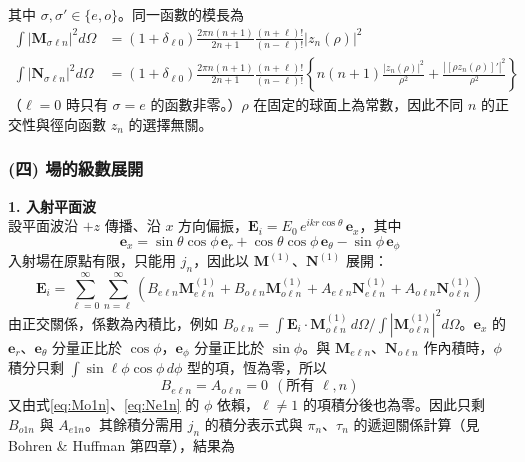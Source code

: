 其中 $\sigma, \sigma' \in \{e, o\}$。同一函數的模長為
\begin{align}
    \int \left| \mathbf{M}_{\sigma\ell n} \right|^2 d\Omega &= \left(1 + \delta_{\ell 0}\right) \frac{2\pi n(n+1)}{2n+1} \frac{(n+\ell)!}{(n-\ell)!} \left| z_n(\rho) \right|^2 \label{eq:normM}\\
    \int \left| \mathbf{N}_{\sigma\ell n} \right|^2 d\Omega &= \left(1 + \delta_{\ell 0}\right) \frac{2\pi n(n+1)}{2n+1} \frac{(n+\ell)!}{(n-\ell)!} \left\{ n(n+1) \frac{\left| z_n(\rho) \right|^2}{\rho^2} + \frac{\left| \left[\rho z_n(\rho)\right]' \right|^2}{\rho^2} \right\}
\end{align}
（$\ell = 0$ 時只有 $\sigma = e$ 的函數非零。）$\rho$ 在固定的球面上為常數，因此不同 $n$ 的正交性與徑向函數 $z_n$ 的選擇無關。

\subsubsection*{(四) 場的級數展開}
\textbf{1. 入射平面波}\\
設平面波沿 $+z$ 傳播、沿 $x$ 方向偏振，$\mathbf{E}_i = E_0\, e^{ikr\cos\theta}\, \mathbf{e}_x$，其中
\begin{equation}
    \mathbf{e}_x = \sin\theta\cos\phi\, \mathbf{e}_r + \cos\theta\cos\phi\, \mathbf{e}_{\theta} - \sin\phi\, \mathbf{e}_{\phi}
\end{equation}
入射場在原點有限，只能用 $j_n$，因此以 $\mathbf{M}^{(1)}$、$\mathbf{N}^{(1)}$ 展開：
\begin{equation}
    \mathbf{E}_i = \sum_{\ell=0}^{\infty} \sum_{n=\ell}^{\infty} \left( B_{e\ell n} \mathbf{M}^{(1)}_{e\ell n} + B_{o\ell n} \mathbf{M}^{(1)}_{o\ell n} + A_{e\ell n} \mathbf{N}^{(1)}_{e\ell n} + A_{o\ell n} \mathbf{N}^{(1)}_{o\ell n} \right)
\end{equation}
由正交關係，係數為內積比，例如 $B_{o\ell n} = \displaystyle \int \mathbf{E}_i \cdot \mathbf{M}^{(1)}_{o\ell n}\, d\Omega \Big/ \int \left| \mathbf{M}^{(1)}_{o\ell n} \right|^2 d\Omega$。$\mathbf{e}_x$ 的 $\mathbf{e}_r$、$\mathbf{e}_{\theta}$ 分量正比於 $\cos\phi$，$\mathbf{e}_{\phi}$ 分量正比於 $\sin\phi$。與 $\mathbf{M}_{e\ell n}$、$\mathbf{N}_{o\ell n}$ 作內積時，$\phi$ 積分只剩 $\int \sin\ell\phi \cos\phi\, d\phi$ 型的項，恆為零，所以
\begin{equation}
    B_{e\ell n} = A_{o\ell n} = 0 \ \ (\text{所有 } \ell, n)
\end{equation}
又由式\eqref{eq:Mo1n}、\eqref{eq:Ne1n} 的 $\phi$ 依賴，$\ell \neq 1$ 的項積分後也為零。因此只剩 $B_{o1n}$ 與 $A_{e1n}$。其餘積分需用 $j_n$ 的積分表示式與 $\pi_n$、$\tau_n$ 的遞迴關係計算（見 Bohren \& Huffman 第四章），結果為
